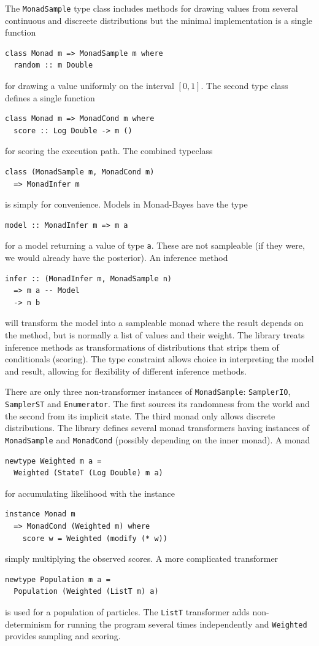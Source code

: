 The \texttt{MonadSample} type class includes methods for drawing values from
several continuous and discreete distributions but the minimal implementation is
a single function
\begin{verbatim}
class Monad m => MonadSample m where
  random :: m Double
  \end{verbatim}
for drawing a value uniformly on the interval $[0,1]$. The second type class
defines a single function
\begin{verbatim}
class Monad m => MonadCond m where
  score :: Log Double -> m ()
  \end{verbatim}
for scoring the execution path. The combined typeclass
\begin{verbatim}
class (MonadSample m, MonadCond m)
  => MonadInfer m
\end{verbatim}
is simply for convenience.
Models in Monad-Bayes have the type
\begin{verbatim}
model :: MonadInfer m => m a
\end{verbatim}
for a model returning a value of type \texttt{a}. These are not sampleable (if they were, we would already have the posterior). An inference method
\begin{verbatim}
infer :: (MonadInfer m, MonadSample n)
  => m a -- Model
  -> n b
\end{verbatim}
will transform the model into a sampleable monad where the result depends on the method, but is normally a list of values and their weight. The library treats inference methods as transformations of distributions that strips them of conditionals (scoring). The type constraint allows choice in interpreting the model and result, allowing for flexibility of different inference methods.

There are only three non-transformer instances of \texttt{MonadSample}: \texttt{SamplerIO}, \texttt{SamplerST} and \texttt{Enumerator}. The first sources its randomness from the world and the second from its implicit state. The third monad only allows discrete distributions. The library defines several monad transformers having instances of \texttt{MonadSample} and \texttt{MonadCond} (possibly depending on the inner monad). A monad
\begin{verbatim}
newtype Weighted m a =
  Weighted (StateT (Log Double) m a)
\end{verbatim}
for accumulating likelihood with the instance
\begin{verbatim}
instance Monad m
  => MonadCond (Weighted m) where
    score w = Weighted (modify (* w))
\end{verbatim}
simply multiplying the observed scores. A more complicated transformer
\begin{verbatim}
newtype Population m a =
  Population (Weighted (ListT m) a)
\end{verbatim}
is used for a population of particles. The \texttt{ListT} transformer adds non-determinism for running the program several times independently and \texttt{Weighted} provides sampling and scoring.

